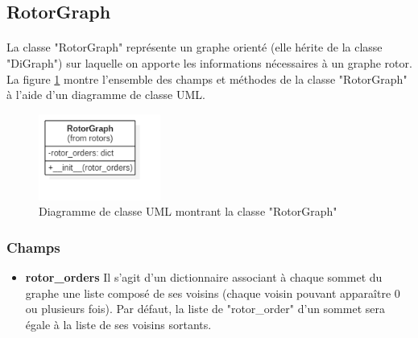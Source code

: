\documentclass{article}
\begin{document}
		\subsection{RotorGraph}
			\label{sec:RotorGraph}
			\paragraph*{}
			La classe "RotorGraph" représente un graphe orienté (elle hérite de la classe "DiGraph") sur laquelle on apporte les informations nécessaires à un graphe rotor. La figure \ref{fig:diagClassRotorGraph} montre l'ensemble des champs et méthodes de la classe "RotorGraph" à l'aide d'un diagramme de classe UML.
			
			\begin{figure}[h]
				\includegraphics[width=4cm]{diagClassRotorGraph.png}
				\centering
				\caption{Diagramme de classe UML montrant la classe "RotorGraph"}
				\label{fig:diagClassRotorGraph}
			\end{figure}
			
			\subsubsection{Champs}
				\label{sec:RotorGraph-Champ}
				\begin{itemize}	
					\item \textbf{rotor\_orders}\newline
					Il s'agit d'un dictionnaire associant à chaque sommet du graphe une liste composé de ses voisins (chaque voisin pouvant apparaître 0 ou plusieurs fois). Par défaut, la liste de "rotor\_order" d'un sommet sera égale à la liste de ses voisins sortants.
				\end{itemize}
		
\end{document}
